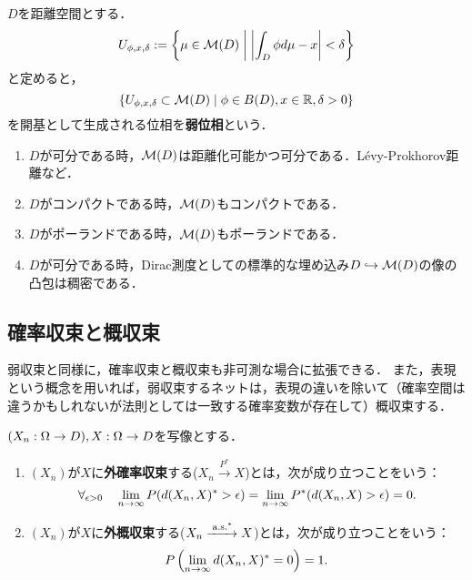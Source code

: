 \documentclass[uplatex,dvipdfmx]{jsreport}
\begin{document}
\begin{definition}
    $D$を距離空間とする．
    \[U_{\phi,x,\delta}:=\left\{\mu\in\mathcal{M}(D)\;\middle|\;\left|\int_D\phi d\mu-x\right|<\delta\right\}\]
    と定めると，
    \[\left\{U_{\phi,x,\delta}\subset\mathcal{M}(D)\;\middle|\;\phi\in B(D),x\in\mathbb{R},\delta>0\right\}\]
    を開基として生成される位相を\textbf{弱位相}という．
\end{definition}

\begin{proposition}\mbox{}
    \begin{enumerate}
        \item $D$が可分である時，$\mathcal{M}(D)$は距離化可能かつ可分である．Lévy-Prokhorov距離など．
        \item $D$がコンパクトである時，$\mathcal{M}(D)$もコンパクトである．
        \item $D$がポーランドである時，$\mathcal{M}(D)$もポーランドである．
        \item $D$が可分である時，Dirac測度としての標準的な埋め込み$D\hookrightarrow\mathcal{M}(D)$の像の凸包は稠密である．
    \end{enumerate}
\end{proposition}

\subsection{確率収束と概収束}

\begin{tcolorbox}[colframe=ForestGreen, colback=ForestGreen!10!white,breakable,colbacktitle=ForestGreen!40!white,coltitle=black,fonttitle=\bfseries\sffamily,
title=]
    弱収束と同様に，確率収束と概収束も非可測な場合に拡張できる．
    また，表現という概念を用いれば，弱収束するネットは，表現の違いを除いて（確率空間は違うかもしれないが法則としては一致する確率変数が存在して）概収束する．
\end{tcolorbox}

\begin{definition}
    $(X_n:\Omega\to D),X:\Omega\to D$を写像とする．
    \begin{enumerate}
        \item $(X_n)$が$X$に\textbf{外確率収束}する($X_n\xrightarrow{P^*}X$)とは，次が成り立つことをいう：
        \[\forall_{\epsilon>0}\quad\lim_{n\to\infty} P(d(X_n,X)^*>\epsilon)=\lim_{n\to\infty} P^*(d(X_n,X)>\epsilon)=0.\]
        \item $(X_n)$が$X$に\textbf{外概収束}する($X_n\xrightarrow{\;\mathrm{a.s.}^*}X$)とは，次が成り立つことをいう：
        \[P\left(\lim_{n\to\infty} d(X_n,X)^*=0\right)=1.\]
    \end{enumerate}
\end{definition}
\end{document}
